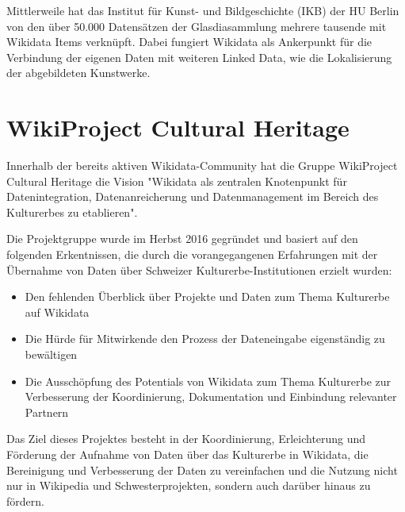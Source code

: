 \documentclass{article}
\begin{document}
Mittlerweile hat das Institut für Kunst- und Bildgeschichte (IKB) der HU Berlin von den über 50.000 Datensätzen der Glasdiasammlung mehrere tausende mit Wikidata Items verknüpft. Dabei fungiert Wikidata als Ankerpunkt für die Verbindung der eigenen Daten mit weiteren Linked Data, wie die Lokalisierung der abgebildeten Kunstwerke. \autocite{hahn_gentle_2017}


\section{WikiProject Cultural Heritage}\label{H1258277}



Innerhalb der bereits aktiven Wikidata-Community hat die Gruppe WikiProject Cultural Heritage die Vision "Wikidata als zentralen Knotenpunkt für Datenintegration, Datenanreicherung und Datenmanagement im Bereich des Kulturerbes zu etablieren". 


Die Projektgruppe wurde im Herbst 2016 gegründet und basiert auf den folgenden Erkentnissen, die durch die vorangegangenen Erfahrungen mit der Übernahme von Daten über Schweizer Kulturerbe-Institutionen erzielt wurden:

\begin{itemize}
\item Den fehlenden Überblick über Projekte und Daten zum Thema Kulturerbe auf Wikidata


\item Die Hürde für Mitwirkende den Prozess der Dateneingabe eigenständig zu bewältigen


\item Die Ausschöpfung des Potentials von Wikidata zum Thema Kulturerbe zur Verbesserung der Koordinierung, Dokumentation und Einbindung relevanter Partnern


\end{itemize}

Das Ziel dieses Projektes besteht in der Koordinierung, Erleichterung und Förderung der Aufnahme von Daten über das Kulturerbe in Wikidata, die Bereinigung und Verbesserung der Daten zu vereinfachen und die Nutzung nicht nur in Wikipedia und Schwesterprojekten, sondern auch darüber hinaus zu fördern. \autocite{noauthor_wikidatawikiproject_nodate}


\printbibliography[title={Literaturverzeichnis}]
\end{document}
